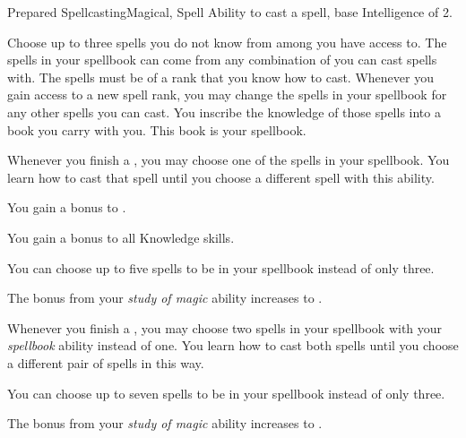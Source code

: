     \begin{feat}{Prepared Spellcasting}{Magical, Spell}
        \featpre Ability to cast a spell, base Intelligence of 2.

         Choose up to three spells you do not know from among  you have access to.
        The spells in your spellbook can come from any combination of  you can cast spells with.
        The spells must be of a rank that you know how to cast.
        Whenever you gain access to a new spell rank, you may change the spells in your spellbook for any other spells you can cast.
        You inscribe the knowledge of those spells into a book you carry with you.
        This book is your spellbook.
        
        Whenever you finish a , you may choose one of the spells in your spellbook.
        You learn how to cast that spell until you choose a different spell with this ability.

         You gain a  bonus to  .

         You gain a  bonus to all Knowledge skills.

         You can choose up to five spells to be in your spellbook instead of only three.

         The bonus from your \textit{study of magic} ability increases to .

         Whenever you finish a , you may choose two spells in your spellbook with your \textit{spellbook} ability instead of one.
        You learn how to cast both spells until you choose a different pair of spells in this way.

         You can choose up to seven spells to be in your spellbook instead of only three.

         The bonus from your \textit{study of magic} ability increases to .
    \end{feat}

